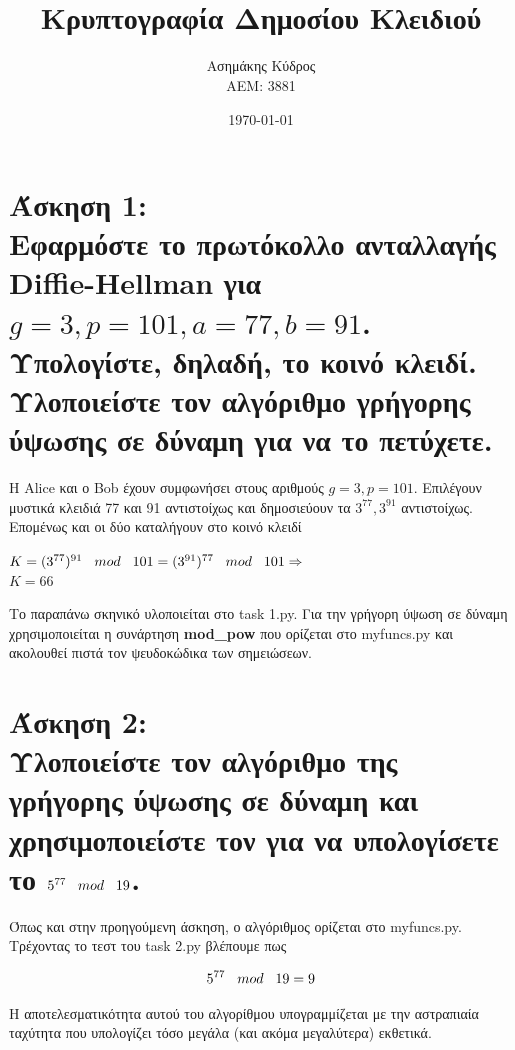 \documentclass{article}
\title{\textbf{\huge \lt{Project II}\\ Κρυπτογραφία Δημοσίου Κλειδιού}}
\author{\LARGE Ασημάκης Κύδρος \\ \LARGE ΑΕΜ: 3881 \\ \LARGE \lt{asimakis@csd.auth.gr}}
\date{\LARGE \today}
\newcommand{\blank}[1]{\hspace*{#1}}
\newcommand{\myspace}{\blank{0.3cm}}
\newcommand{\lt}[1]{\latintext #1\greektext}
\newcommand{\task}[2]{\newpage\section*{Άσκηση #1:\\#2}}
\newcommand{\blt}[1]{\lt{\textbf{#1}}}
\newcommand{\mymod}[2]{#1 \myspace mod \myspace #2}
\begin{document}
\maketitle
\Large

\task{1}{
    Εφαρμόστε το πρωτόκολλο ανταλλαγής \lt{Diffie-Hellman} για $g = 3, p = 101, a = 77, b = 91$. Υπολογίστε, δηλαδή, το κοινό κλειδί. Υλοποιείστε τον αλγόριθμο γρήγορης ύψωσης σε δύναμη για να το πετύχετε. 
}
{
    Η \lt{Alice} και ο \lt{Bob} έχουν συμφωνήσει στους αριθμούς $g = 3, p = 101$. Επιλέγουν μυστικά κλειδιά 77 και 91 αντιστοίχως και δημοσιεύουν τα $3^{77}, 3^{91}$ αντιστοίχως. Επομένως και οι δύο καταλήγουν στο κοινό κλειδί 
    
    \begin{center}
        $K = \mymod{(3^{77})^{91}}{101} = \mymod{(3^{91})^{77}}{101} \Rightarrow$\\
        $K = 66$
    \end{center}
    
    Το παραπάνω σκηνικό υλοποιείται στο \lt{task 1.py}. Για την γρήγορη ύψωση σε δύναμη χρησιμοποιείται η συνάρτηση \blt{mod\_pow} που ορίζεται στο \lt{myfuncs.py} και ακολουθεί πιστά τον ψευδοκώδικα των σημειώσεων.
}

\task{2}{
    Υλοποιείστε τον αλγόριθμο της γρήγορης ύψωσης σε δύναμη και χρησιμοποιείστε τον για να υπολογίσετε το $\mymod{5^{77}}{19}$.
}
{
    Όπως και στην προηγούμενη άσκηση, ο αλγόριθμος ορίζεται στο \lt{myfuncs.py}. Τρέχοντας το τεστ του \lt{task 2.py} βλέπουμε πως
    
    \begin{equation*}
        \mymod{5^{77}}{19} = 9
    \end{equation*}
    
    Η αποτελεσματικότητα αυτού του αλγορίθμου υπογραμμίζεται με την αστραπιαία ταχύτητα που υπολογίζει τόσο μεγάλα (και ακόμα μεγαλύτερα) εκθετικά.
}
\end{document}
